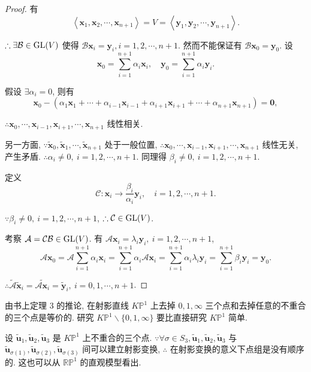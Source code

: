 \documentclass{ctexart}
\begin{document}
\begin{proof}
    有
    \[\left<\boldsymbol{x}_1,\boldsymbol{x}_2,\cdots,\boldsymbol{x}_{n+1}\right>=V=\left<\boldsymbol{y}_1,\boldsymbol{y}_2,\cdots,\boldsymbol{y}_{n+1}\right>.\]

    $\therefore\exists\mathcal{B}\in\operatorname{GL} (V)$ 使得 $\mathcal{B}\boldsymbol{x}_i=\boldsymbol{y}_i,i=1,2,\cdots,n+1$. 然而不能保证有 $\mathcal{B}\boldsymbol{x}_0=\boldsymbol{y}_0$. 设
    \[\boldsymbol{x}_0=\sum\limits_{i=1}^{n+1}\alpha_i\boldsymbol{x}_i,\quad\boldsymbol{y}_0=\sum\limits_{i=1}^{n+1}\alpha_i\boldsymbol{y}_i.\]

    假设 $\exists\alpha_i=0$, 则有
    \[\boldsymbol{x}_0-(\alpha_1\boldsymbol{x}_1+\cdots+\alpha_{i-1}\boldsymbol{x}_{i-1}+\alpha_{i+1}\boldsymbol{x}_{i+1}+\cdots+\alpha_{n+1}\boldsymbol{x}_{n+1})=\boldsymbol{0},\]

    $\therefore\boldsymbol{x}_0,\cdots,\boldsymbol{x}_{i-1},\boldsymbol{x}_{i+1},\cdots,\boldsymbol{x}_{n+1}$ 线性相关.
    
    另一方面, $\because\tilde{\boldsymbol{x}}_0,\tilde{\boldsymbol{x}}_1,\cdots,\tilde{\boldsymbol{x}}_{n+1}$ 处于一般位置, $\therefore\boldsymbol{x}_0,\cdots,\boldsymbol{x}_{i-1},\boldsymbol{x}_{i+1},\cdots,\boldsymbol{x}_{n+1}$ 线性无关, 产生矛盾. $\therefore\alpha_i\neq0,\ i=1,2,\cdots,n+1$. 同理得 $\beta_i\neq0,\ i=1,2,\cdots,n+1$.
    
    定义
    \[\mathcal{C}:\boldsymbol{x}_i\to\dfrac{\beta_i}{\alpha_i}\boldsymbol{y}_i,\quad i=1,2,\cdots,n+1.\]

    $\because\beta_i\neq0,\ i=1,2,\cdots,n+1$, $\therefore\mathcal{C}\in\operatorname{GL} (V)$.

    考察 $\mathcal{A}=\mathcal{CB}\in\operatorname{GL} (V)$. 有 $\mathcal{A}\boldsymbol{x}_i=\lambda_i\boldsymbol{y}_i,\ i=1,2,\cdots,n+1$,
    \[\mathcal{A}\boldsymbol{x}_0=\mathcal{A}\sum\limits_{i=1}^{n+1}\alpha_i\boldsymbol{x}_i=\sum\limits_{i=1}^{n+1}\alpha_i\mathcal{A}\boldsymbol{x}_i=\sum\limits_{i=1}^{n+1}\alpha_i\lambda_i\boldsymbol{y}_i=\sum\limits_{i=1}^{n+1}\beta_i\boldsymbol{y}_i=\boldsymbol{y}_0.\]

    $\therefore\widetilde{\mathcal{A}}\tilde{\boldsymbol{x}}_i=\widetilde{\mathcal{A}\boldsymbol{x}_i}=\tilde{\boldsymbol{y}}_i,\ i=0,1,\cdots,n+1$.
\end{proof}
由书上定理 3 的推论, 在射影直线 $K\mathbb{P}^1$ 上去掉 $0,1,\infty$ 三个点和去掉任意的不重合的三个点是等价的. 研究 $K\mathbb{P}^1\backslash\{0,1,\infty\}$ 要比直接研究 $K\mathbb{P}^1$ 简单.

设 $\tilde{\boldsymbol{u}}_1,\tilde{\boldsymbol{u}}_2,\tilde{\boldsymbol{u}}_3$ 是 $K\mathbb{P}^1$ 上不重合的三个点. $\because\forall\sigma\in S_3,\tilde{\boldsymbol{u}}_1,\tilde{\boldsymbol{u}}_2,\tilde{\boldsymbol{u}}_3$ 与 $\tilde{\boldsymbol{u}}_{\sigma(1)},\tilde{\boldsymbol{u}}_{\sigma(2)},\tilde{\boldsymbol{u}}_{\sigma(3)}$ 间可以建立射影变换, $\therefore$ 在射影变换的意义下点组是没有顺序的. 这也可以从 $\mathbb{RP}^1$ 的直观模型看出.
\end{document}
